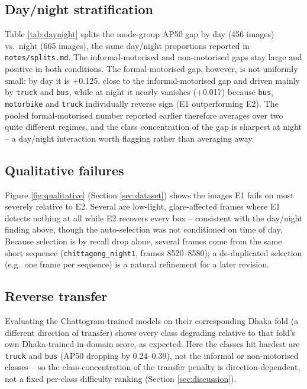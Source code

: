 \documentclass[conference,a4paper]{IEEEtran}
\begin{document}
\subsection{Day/night stratification}

Table \ref{tab:daynight} splits the mode-group AP50 gap by day (456 images) vs.\ night
(665 images), the same day/night proportions reported in \texttt{notes/splits.md}.
The informal-motorised and non-motorised gaps stay large and positive in both
conditions. The formal-motorised gap, however, is not uniformly small: by day it is
+0.125, close to the informal-motorised gap and driven mainly by \texttt{truck} and
\texttt{bus}, while at night it nearly vanishes (+0.017) because \texttt{bus},
\texttt{motorbike} and \texttt{truck} individually reverse sign (E1 outperforming E2).
The pooled formal-motorised number reported earlier therefore averages over two quite
different regimes, and the class concentration of the gap is sharpest at night -- a
day/night interaction worth flagging rather than averaging away.

\subsection{Qualitative failures}
Figure \ref{fig:qualitative} (Section \ref{sec:dataset}) shows the images E1 fails on most severely relative to
E2. Several are low-light, glare-affected frames where E1 detects nothing at all
while E2 recovers every box -- consistent with the day/night finding above, though
the auto-selection was not conditioned on time of day. Because selection is by
recall drop alone, several frames come from the same short sequence
(\texttt{chittagong\_night1}, frames 8520--8580); a de-duplicated selection (e.g.\ one
frame per sequence) is a natural refinement for a later revision.

\subsection{Reverse transfer}
Evaluating the Chattogram-trained models on their corresponding Dhaka fold (a
different direction of transfer) shows every class degrading relative to that fold's
own Dhaka-trained in-domain score, as expected. Here the classes hit hardest are
\texttt{truck} and \texttt{bus} (AP50 dropping by 0.24--0.39), not the informal or
non-motorised classes -- so the class-concentration of the transfer penalty is
direction-dependent, not a fixed per-class difficulty ranking (Section
\ref{sec:discussion}).
\end{document}
